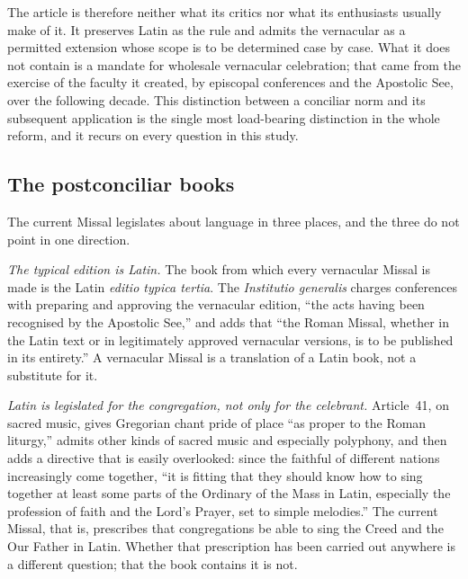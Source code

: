 The article is therefore neither what its critics nor what its enthusiasts usually make of it. It preserves Latin as the rule and admits the vernacular as a permitted extension whose scope is to be determined case by case. What it does not contain is a mandate for wholesale vernacular celebration; that came from the exercise of the faculty it created, by episcopal conferences and the Apostolic See, over the following decade. This distinction between a conciliar norm and its subsequent application is the single most load-bearing distinction in the whole reform, and it recurs on every question in this study.

\subsection{The postconciliar books}

The current Missal legislates about language in three places, and the three do not point in one direction.

\emph{The typical edition is Latin.} The book from which every vernacular Missal is made is the Latin \emph{editio typica tertia}. The \emph{Institutio generalis} charges conferences with preparing and approving the vernacular edition, ``the acts having been recognised by the Apostolic See,'' and adds that ``the Roman Missal, whether in the Latin text or in legitimately approved vernacular versions, is to be published in its entirety.'' A vernacular Missal is a translation of a Latin book, not a substitute for it.

\emph{Latin is legislated for the congregation, not only for the celebrant.} Article~41, on sacred music, gives Gregorian chant pride of place ``as proper to the Roman liturgy,'' admits other kinds of sacred music and especially polyphony, and then adds a directive that is easily overlooked: since the faithful of different nations increasingly come together, ``it is fitting that they should know how to sing together at least some parts of the Ordinary of the Mass in Latin, especially the profession of faith and the Lord's Prayer, set to simple melodies.'' The current Missal, that is, prescribes that congregations be able to sing the Creed and the Our Father in Latin. Whether that prescription has been carried out anywhere is a different question; that the book contains it is not.

